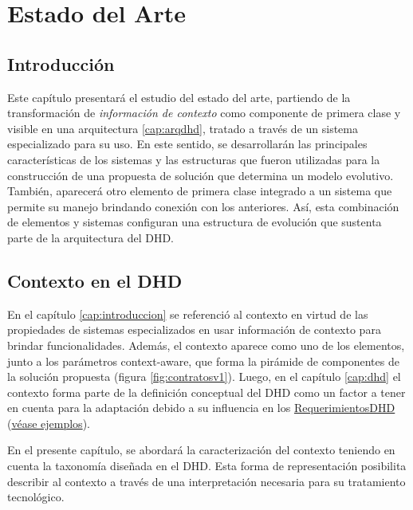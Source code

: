 \chapter{Estado del Arte} \label{cap:estadodelarte} \label{cap:3}


\section{Introducción}

Este capítulo presentará el estudio del estado del arte, partiendo de
la transformación de \textit{información de contexto} como componente de primera clase y visible en una arquitectura \ref{cap:arqdhd}, tratado a través de un sistema especializado para su uso. En este sentido, se desarrollarán las principales características de los sistemas y las estructuras que fueron utilizadas para la construcción de una propuesta de solución que determina un modelo evolutivo. También, aparecerá  otro elemento de primera clase integrado a un sistema que permite su manejo brindando conexión con los anteriores. Así, esta combinación de elementos y sistemas configuran una
estructura de evolución que sustenta parte de la arquitectura del DHD.




\section{Contexto en el DHD}

En el capítulo \ref{cap:introduccion} se referenció al contexto en
virtud de las propiedades de sistemas especializados en usar información
de contexto para brindar funcionalidades. Además, el contexto aparece como uno
de los elementos, junto a los parámetros context-aware, que forma la
pirámide de componentes de la solución propuesta (figura \ref{fig:contratosv1}).
Luego, en el capítulo \ref{cap:dhd} el contexto forma parte de la definición
conceptual del DHD como un factor a tener en cuenta para la adaptación debido a
su influencia en los \hyperref[requerimientosdhd]{RequerimientosDHD}
(\hyperref[ejemplo1]{véase ejemplos}). 

En el presente capítulo, se abordará la caracterización del contexto teniendo en cuenta la taxonomía diseñada en el DHD. Esta forma de representación posibilita describir al contexto a través de una interpretación necesaria para su tratamiento tecnológico.


